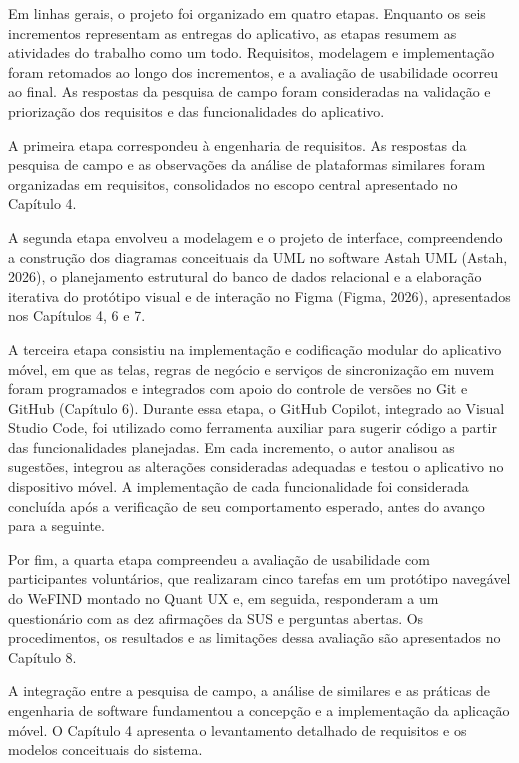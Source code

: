 Em linhas gerais, o projeto foi organizado em quatro etapas. Enquanto os seis incrementos representam as entregas do aplicativo, as etapas resumem as atividades do trabalho como um todo. Requisitos, modelagem e implementação foram retomados ao longo dos incrementos, e a avaliação de usabilidade ocorreu ao final. As respostas da pesquisa de campo foram consideradas na validação e priorização dos requisitos e das funcionalidades do aplicativo.

A primeira etapa correspondeu à engenharia de requisitos. As respostas da pesquisa de campo e as observações da análise de plataformas similares foram organizadas em requisitos, consolidados no escopo central apresentado no Capítulo 4.

A segunda etapa envolveu a modelagem e o projeto de interface, compreendendo a construção dos diagramas conceituais da UML no software Astah UML (Astah, 2026), o planejamento estrutural do banco de dados relacional e a elaboração iterativa do protótipo visual e de interação no Figma (Figma, 2026), apresentados nos Capítulos 4, 6 e 7.

A terceira etapa consistiu na implementação e codificação modular do aplicativo móvel, em que as telas, regras de negócio e serviços de sincronização em nuvem foram programados e integrados com apoio do controle de versões no Git e GitHub (Capítulo 6). Durante essa etapa, o GitHub Copilot, integrado ao Visual Studio Code, foi utilizado como ferramenta auxiliar para sugerir código a partir das funcionalidades planejadas. Em cada incremento, o autor analisou as sugestões, integrou as alterações consideradas adequadas e testou o aplicativo no dispositivo móvel. A implementação de cada funcionalidade foi considerada concluída após a verificação de seu comportamento esperado, antes do avanço para a seguinte.

Por fim, a quarta etapa compreendeu a avaliação de usabilidade com participantes voluntários, que realizaram cinco tarefas em um protótipo navegável do WeFIND montado no Quant UX e, em seguida, responderam a um questionário com as dez afirmações da SUS e perguntas abertas. Os procedimentos, os resultados e as limitações dessa avaliação são apresentados no Capítulo 8.

A integração entre a pesquisa de campo, a análise de similares e as práticas de engenharia de software fundamentou a concepção e a implementação da aplicação móvel. O Capítulo 4 apresenta o levantamento detalhado de requisitos e os modelos conceituais do sistema.
